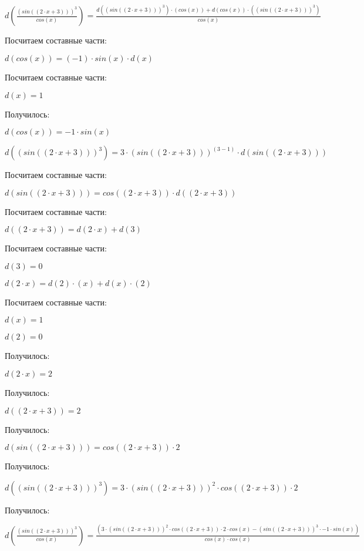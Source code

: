 $ d(\frac{(sin((2 \cdot x+3)))^3}{cos(x)}) = \frac{d((sin((2 \cdot x+3)))^3) \cdot (cos(x)) + d(cos(x)) \cdot ((sin((2 \cdot x+3)))^3)}{cos(x)}$

Посчитаем составные части:

$ d(cos(x)) = (-1) \cdot sin(x) \cdot d(x)$

Посчитаем составные части:

$ d(x) = 1$

Получилось:

$ d(cos(x)) = -1 \cdot sin(x)$

$ d((sin((2 \cdot x+3)))^3) = 3 \cdot (sin((2 \cdot x+3)))^(3 - 1) \cdot d(sin((2 \cdot x+3)))$

Посчитаем составные части:

$ d(sin((2 \cdot x+3))) = cos((2 \cdot x+3)) \cdot d((2 \cdot x+3))$

Посчитаем составные части:

$ d((2 \cdot x+3)) = d(2 \cdot x) + d(3)$

Посчитаем составные части:

$ d(3) = 0$

$ d(2 \cdot x) = d(2) \cdot (x) + d(x) \cdot (2)$

Посчитаем составные части:

$ d(x) = 1$

$ d(2) = 0$

Получилось:

$ d(2 \cdot x) = 2$

Получилось:

$ d((2 \cdot x+3)) = 2$

Получилось:

$ d(sin((2 \cdot x+3))) = cos((2 \cdot x+3)) \cdot 2$

Получилось:

$ d((sin((2 \cdot x+3)))^3) = 3 \cdot (sin((2 \cdot x+3)))^2 \cdot cos((2 \cdot x+3)) \cdot 2$

Получилось:

$ d(\frac{(sin((2 \cdot x+3)))^3}{cos(x)}) = \frac{(3 \cdot (sin((2 \cdot x+3)))^2 \cdot cos((2 \cdot x+3)) \cdot 2 \cdot cos(x)-(sin((2 \cdot x+3)))^3 \cdot -1 \cdot sin(x))}{cos(x) \cdot cos(x)}$

